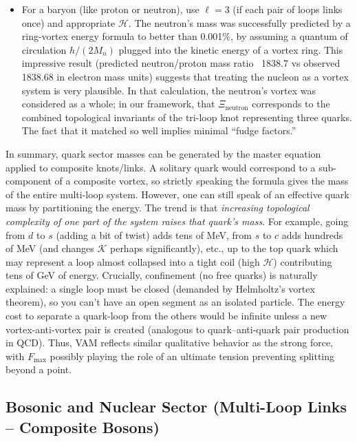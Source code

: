 \begin{itemize}
\begin{itemize}
\item
For a baryon (like proton or neutron), use $\ell=3$ (if each pair of loops links once) and appropriate $\mathcal{H}$. The neutron’s mass was successfully predicted by a ring-vortex energy formula to better than 0.001\%, by assuming a quantum of circulation $h/(2M_n)$ plugged into the kinetic energy of a vortex ring. This impressive result (predicted neutron/proton mass ratio ~1838.7 vs observed 1838.68 in electron mass units) suggests that treating the nucleon as a vortex system is very plausible. In that calculation, the neutron’s vortex was considered as a whole; in our framework, that $\Xi_{\text{neutron}}$ corresponds to the combined topological invariants of the tri-loop knot representing three quarks. The fact that it matched so well implies minimal “fudge factors.”

\end{itemize}
\end{itemize}

In summary, quark sector masses can be generated by the master equation applied to composite knots/links. A solitary quark would correspond to a sub-component of a composite vortex, so strictly speaking the formula gives the mass of the entire multi-loop system. However, one can still speak of an effective quark mass by partitioning the energy. The trend is that \textit{increasing topological complexity of one part of the system raises that quark’s mass}. For example, going from $d$ to $s$ (adding a bit of twist) adds tens of MeV, from $s$ to $c$ adds hundreds of MeV (and changes $\mathcal{K}$ perhaps significantly), etc., up to the top quark which may represent a loop almost collapsed into a tight coil (high $\mathcal{H}$) contributing tens of GeV of energy. Crucially, confinement (no free quarks) is naturally explained: a single loop must be closed (demanded by Helmholtz’s vortex theorem), so you can’t have an open segment as an isolated particle. The energy cost to separate a quark-loop from the others would be infinite unless a new vortex-anti-vortex pair is created (analogous to quark–anti-quark pair production in QCD). Thus, VAM reflects similar qualitative behavior as the strong force, with $F_{\max}$ possibly playing the role of an ultimate tension preventing splitting beyond a point.\subsection*{Bosonic and Nuclear Sector (Multi-Loop Links – Composite Bosons)}

